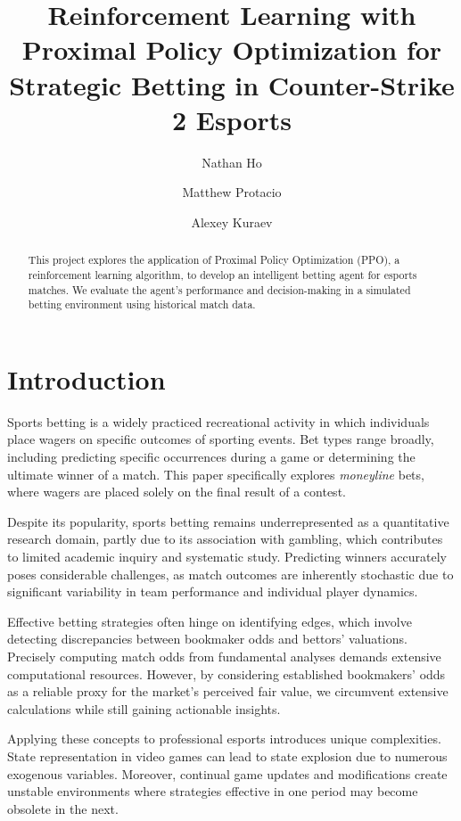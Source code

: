 \documentclass[sigconf]{acmart}
\title{Reinforcement Learning with Proximal Policy Optimization for Strategic Betting in Counter-Strike 2 Esports}
\author{Nathan Ho}
\affiliation{%
  \institution{Drexel University}
  \city{Philadelphia}
  \state{PA}
  \country{USA}
}
\author{Matthew Protacio}
\affiliation{%
  \institution{Drexel University}
  \city{Philadelphia}
  \state{PA}
  \country{USA}
}
\author{Alexey Kuraev}
\affiliation{%
  \institution{Drexel University}
  \city{Philadelphia}
  \state{PA}
  \country{USA}
}
\begin{document}
\begin{abstract}
This project explores the application of Proximal Policy Optimization (PPO), a reinforcement learning algorithm, to develop an intelligent betting agent for esports matches. We evaluate the agent's performance and decision-making in a simulated betting environment using historical match data.
\end{abstract}

\maketitle

\section{Introduction}

Sports betting is a widely practiced recreational activity in which individuals place wagers on specific outcomes of sporting events. Bet types range broadly, including predicting specific occurrences during a game or determining the ultimate winner of a match. This paper specifically explores \textit{moneyline} bets, where wagers are placed solely on the final result of a contest.

Despite its popularity, sports betting remains underrepresented as a quantitative research domain, partly due to its association with gambling, which contributes to limited academic inquiry and systematic study. Predicting winners accurately poses considerable challenges, as match outcomes are inherently stochastic due to significant variability in team performance and individual player dynamics.

Effective betting strategies often hinge on identifying edges, which involve detecting discrepancies between bookmaker odds and bettors' valuations. Precisely computing match odds from fundamental analyses demands extensive computational resources. However, by considering established bookmakers' odds as a reliable proxy for the market's perceived fair value, we circumvent extensive calculations while still gaining actionable insights.

Applying these concepts to professional esports introduces unique complexities. State representation in video games can lead to state explosion due to numerous exogenous variables. Moreover, continual game updates and modifications create unstable environments where strategies effective in one period may become obsolete in the next.
\end{document}

